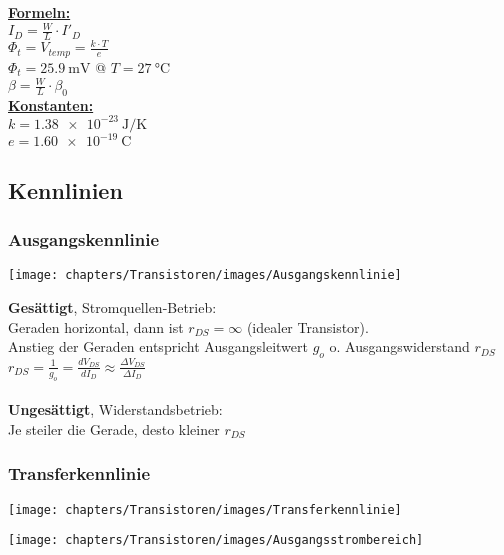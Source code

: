 \begin{minipage}[c]{0.24\textwidth}
	\uline{\textbf{Formeln:}}\\
	$I_D = \frac{W}{L}\cdot I'_D$\\
	$\Phi_t = V_{temp} = \frac{k\cdot T}{e}$\\
	$\Phi_t = \SI{25.9}{\milli\volt}$ @ $T = \SI{27}{\degreeCelsius}$\\
	$\beta = \frac{W}{L} \cdot \beta_0$ \\[2ex]
	\uline{\textbf{Konstanten:}}\\
	$k = \SI{1.38e-23}{\joule /\kelvin}$\\
	$e = \SI{1.60e-19}{\coulomb}$
\end{minipage}

\subsection{Kennlinien}
\subsubsection{Ausgangskennlinie}

\begin{minipage}[c]{0.35\textwidth}
	\texttt{[image: chapters/Transistoren/images/Ausgangskennlinie]}
\end{minipage}
\begin{minipage}[c]{0.65\textwidth}
	\textbf{Gesättigt}, Stromquellen-Betrieb:\\
	Geraden horizontal, dann ist $r_{DS} = \infty$ (idealer Transistor).\\
	Anstieg der Geraden entspricht Ausgangsleitwert $g_o$ o. Ausgangswiderstand $r_{DS}$\\
	$r_{DS} = \frac{1}{g_o} = \frac{dV_{DS}}{dI_D} \approx \frac{\Delta V_{DS}}{\Delta I_D}$\\ \\
	\textbf{Ungesättigt}, Widerstandsbetrieb:\\
	Je steiler die Gerade, desto kleiner $r_{DS}$
\end{minipage}

\subsubsection{Transferkennlinie}
\begin{minipage}{0.38\textwidth}
	\texttt{[image: chapters/Transistoren/images/Transferkennlinie]}
\end{minipage}
\begin{minipage}{0.58\textwidth}
	\texttt{[image: chapters/Transistoren/images/Ausgangsstrombereich]} 
\end{minipage}

